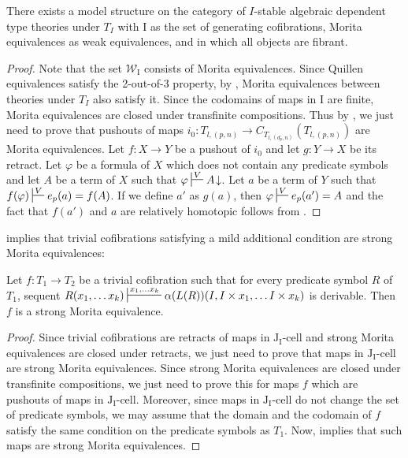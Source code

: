 \documentclass[reqno]{amsart}
\theoremstyle{definition}
\theoremstyle{remark}
\newcommand{\we}{\mathcal{W}}
\newcommand{\I}{\mathrm{I}}
\newcommand{\J}{\mathrm{J}}
\newcommand{\class}[2]{#1\text{-}\mathrm{#2}}
\newcommand{\Icell}[1][\I]{\class{#1}{cell}}
\newcommand{\Jcell}[1][]{\Icell[\J#1]}
\newcommand{\cyli}{i}
\numberwithin{figure}{section}
\begin{document}
\begin{thm}
There exists a model structure on the category of $I$-stable algebraic dependent type theories under $T_I$
with $\I$ as the set of generating cofibrations, Morita equivalences as weak equivalences, and in which all objects are fibrant.
\end{thm}
\begin{proof}
Note that the set $\we_\I$ consists of Morita equivalences.
Since Quillen equivalences satisfy the 2-out-of-3 property, by , Morita equivalences between theories under $T_I$ also satisfy it.
Since the codomains of maps in $\I$ are finite, Morita equivalences are closed under transfinite compositions.
Thus by , we just need to prove that pushouts of maps $\cyli_0 : T_{l,(p,n)} \to C_{T_{l,(d_p,n)}}(T_{l,(p,n)})$ are Morita equivalences.
Let $f : X \to Y$ be a pushout of $\cyli_0$ and let $g : Y \to X$ be its retract.
Let $\varphi$ be a formula of $X$ which does not contain any predicate symbols and let $A$ be a term of $X$ such that $\varphi \sststile{}{V} A\!\downarrow$.
Let $a$ be a term of $Y$ such that $f(\varphi) \sststile{}{V} e_p(a) = f(A)$.
If we define $a'$ as $g(a)$, then $\varphi \sststile{}{V} e_p(a') = A$ and the fact that $f(a')$ and $a$ are relatively homotopic follows from .
\end{proof}

 implies that trivial cofibrations satisfying a mild additional condition are strong Morita equivalences:

\begin{prop}
Let $f : T_1 \to T_2$ be a trivial cofibration such that for every predicate symbol $R$ of $T_1$,
sequent $R(x_1, \ldots x_k) \sststile{}{x_1, \ldots x_k} \alpha(L(R))(I, I \times x_1, \ldots I \times x_k)$ is derivable.
Then $f$ is a strong Morita equivalence.
\end{prop}
\begin{proof}
Since trivial cofibrations are retracts of maps in $\Jcell[_\I]$ and strong Morita equivalences are closed under retracts,
we just need to prove that maps in $\Jcell[_\I]$ are strong Morita equivalences.
Since strong Morita equivalences are closed under transfinite compositions, we just need to prove this for maps $f$ which are pushouts of maps in $\Jcell[_\I]$.
Moreover, since maps in $\Jcell[_\I]$ do not change the set of predicate symbols,
we may assume that the domain and the codomain of $f$ satisfy the same condition on the predicate symbols as $T_1$.
Now,  implies that such maps are strong Morita equivalences.
\end{proof}
\end{document}
